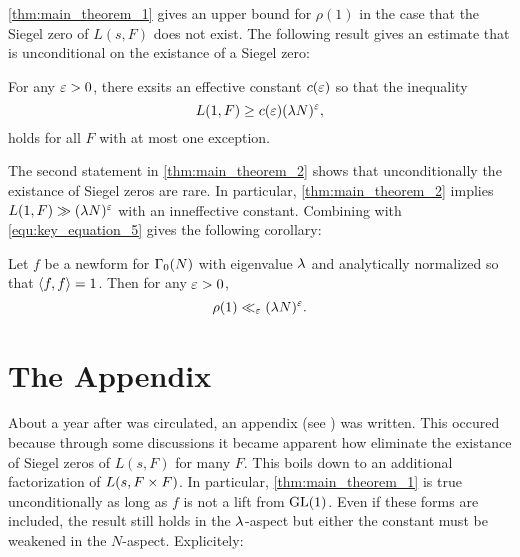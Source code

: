 \documentclass[12pt,reqno,oneside]{amsart}
\begin{document}
    \cref{thm:main_theorem_1} gives an upper bound for $\rho(1)$ in the case that the Siegel zero of $L(s,F)$ does not exist. The following result gives an estimate that is unconditional on the existance of a Siegel zero:

    \begin{theorem}\label{thm:main_theorem_2}
        For any $\varepsilon > 0$, there exsits an effective constant $c(\varepsilon)$ so that the inequality
        \[
            L(1,F) \ge c(\varepsilon)(\lambda N)^{\varepsilon},
        \]
        holds for all $F$ with at most one exception.
    \end{theorem}

    The second statement in \cref{thm:main_theorem_2} shows that unconditionally the existance of Siegel zeros are rare. In particular, \cref{thm:main_theorem_2} implies $L(1,F) \gg (\lambda N)^{\varepsilon}$ with an inneffective constant. Combining with \cref{equ:key_equation_5} gives the following corollary:

    \begin{corollary}
        Let $f$ be a newform for $\Gamma_{0}(N)$ with eigenvalue $\lambda$ and analytically normalized so that $\langle f,f\rangle = 1$. Then for any $\varepsilon > 0$,
        \[
            \rho(1) \ll_{\varepsilon} (\lambda N)^{\varepsilon}.
        \]
    \end{corollary}
\section*{The Appendix}
    About a year after \cite{HL} was circulated, an appendix (see \cite{GHL}) was written. This occured because through some discussions it became apparent how eliminate the existance of Siegel zeros of $L(s,F)$ for many $F$. This boils down to an additional factorization of $L(s,F \times F)$. In particular, \cref{thm:main_theorem_1} is true unconditionally as long as $f$ is not a lift from $\mathrm{GL}(1)$. Even if these forms are included, the result still holds in the $\lambda$-aspect but either the constant must be weakened in the $N$-aspect. Explicitely:
\end{document}
